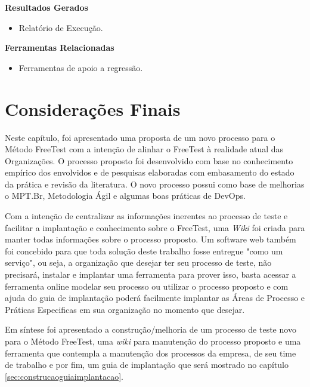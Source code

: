 \textbf{Resultados Gerados}
\begin{itemize}
    \item Relatório de Execução.
\end{itemize}

\textbf{Ferramentas Relacionadas}
\begin{itemize}
    \item Ferramentas de apoio a regressão.
\end{itemize}






\section{Considerações Finais}
\label{sec:consideracoesfinaiscap4}

Neste capítulo, foi apresentado uma proposta de um novo processo para o Método FreeTest com a intenção de alinhar o FreeTest à realidade atual das Organizações. O processo proposto foi desenvolvido com base no conhecimento empírico dos envolvidos e de pesquisas elaboradas com embasamento do estado da prática e revisão da literatura. O novo processo possui como base de melhorias o MPT.Br, Metodologia Ágil e algumas boas práticas de DevOps. 

Com a intenção de centralizar as informações inerentes ao processo de teste e facilitar a implantação e conhecimento sobre o FreeTest, uma \textit{Wiki} foi criada para manter todas informações sobre o processo proposto. Um software web também foi concebido para que toda solução deste trabalho fosse entregue "como um serviço", ou seja, a organização que desejar ter seu processo de teste, não precisará, instalar e implantar uma ferramenta para prover isso, basta acessar a ferramenta online modelar seu processo ou utilizar o processo proposto e com ajuda do guia de implantação poderá facilmente implantar as Áreas de Processo e Práticas Especificas em sua organização no momento que desejar.

Em síntese foi apresentado a construção/melhoria de um processo de teste novo para o Método FreeTest, uma \textit{wiki} para manutenção do processo proposto e uma ferramenta que contempla a manutenção dos processos da empresa, de seu time de trabalho e por fim, um guia de implantação que será mostrado no capítulo \ref{sec:construcaoguiaimplantacao}.